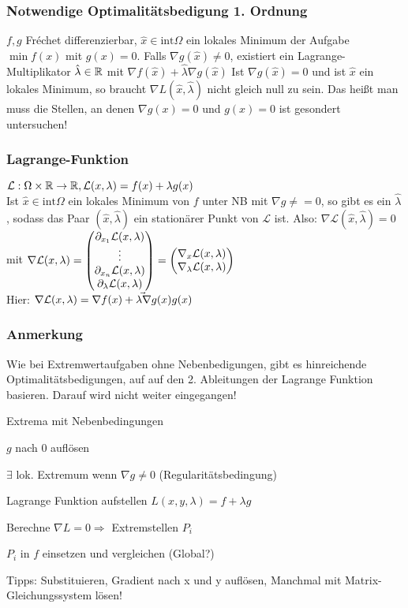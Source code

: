 \documentclass[german]{latex4ei/latex4ei_sheet}
\begin{document}
\subsubsection{Notwendige Optimalit\"atsbedigung 1. Ordnung}
$f,g$ Fr\'echet differenzierbar, $\hat{x} \in \mathrm{int} \Omega$ ein lokales Minimum der Aufgabe $\min f(x)$ mit $g(x)=0$. Falls $\nabla g(\hat{x}) \neq 0$, existiert ein Lagrange-Multiplikator $\hat{\lambda} \in \operatorname{\mathbb R}$ mit $\nabla f(\hat{x}) + \hat{\lambda} \nabla g(\hat{x})$
Ist $\nabla g(\hat{x})=0$ und ist $\hat{x}$ ein lokales Minimum, so braucht $\nabla L(\hat{x},\hat{\lambda})$ nicht gleich null zu sein. Das hei\ss{}t man muss die Stellen, an denen $\nabla g(x)=0$ und $g(x)=0$ ist gesondert untersuchen!

\newcommand{\Lagr}{\mathcal{L}}

\subsubsection{Lagrange-Funktion}
$\Lagr: \Omega \times \R \to \R, \Lagr(x,\lambda)=f(x)+\lambda g(x)$\\
Ist $\hat{x} \in \mathrm{int} \Omega$ ein lokales Minimum von $f$ unter NB mit $\nabla g \neq = 0$, so gibt es ein $\hat{\lambda}$, sodass das Paar $(\hat{x},\hat{\lambda})$ ein station\"arer Punkt von $\Lagr$ ist. Also: $\nabla \Lagr (\hat{x},\hat{\lambda})=0$ mit $\nabla \Lagr(x,\lambda)=\vect{\partial_{x_1} \Lagr(x,\lambda) \\ \vdots \\ \partial_{x_n} \Lagr (x,\lambda)\\\partial_\lambda \Lagr(x,\lambda)}=\vect{\nabla_x \Lagr(x,\lambda) \\ \nabla_\lambda \Lagr(x,\lambda)}$\\
Hier: $\nabla \Lagr (x,\lambda)=\vec{\nabla f(x) + \lambda \nabla g(x) \\ g(x)}$

\subsubsection{Anmerkung}
Wie bei Extremwertaufgaben ohne Nebenbedigungen, gibt es hinreichende Optimalit\"atsbedigungen, auf auf den 2. Ableitungen der Lagrange Funktion basieren. Darauf wird nicht weiter eingegangen!\\

\begin{cookbox}{Extrema mit Nebenbedingungen}
\item $g$ nach $0$ aufl\"osen
\item $\exists$ lok. Extremum wenn $\nabla g \neq 0$ (Regularit\"atsbedingung)
\item Lagrange Funktion aufstellen $L(x,y,\lambda)=f+ \lambda g$
\item Berechne $\nabla L=0 \Rightarrow$ Extremstellen $P_i$
\item $P_i$ in $f$ einsetzen und vergleichen (Global?)
\item Tipps: Substituieren, Gradient nach x und y aufl\"osen, Manchmal mit Matrix-Gleichungssystem l\"osen!
\end{cookbox}
\end{document}
